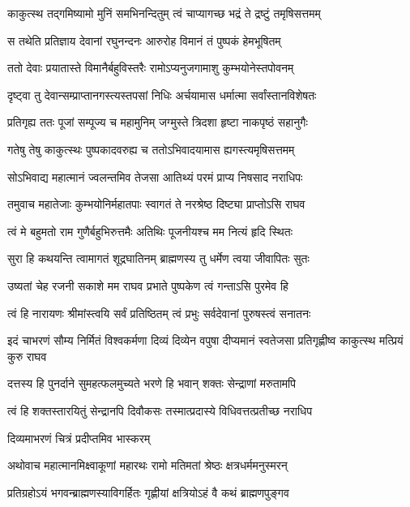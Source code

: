 \twolineshloka
{काकुत्स्थ तद्गमिष्यामो मुनिं समभिनन्दितुम्}
{त्वं चाप्यागच्छ भद्रं ते द्रष्टुं तमृषिसत्तमम्} %

\twolineshloka
{स तथेति प्रतिज्ञाय देवानां रघुनन्दनः}
{आरुरोह विमानं तं पुष्पकं हेमभूषितम्} %

\twolineshloka
{ततो देवाः प्रयातास्ते विमानैर्बहुविस्तरैः}
{रामोऽप्यनुजगामाशु कुम्भयोनेस्तपोवनम्} %

\twolineshloka
{दृष्ट्वा तु देवान्सम्प्राप्तानगस्त्यस्तपसां निधिः}
{अर्चयामास धर्मात्मा सर्वांस्तानविशेषतः} %

\twolineshloka
{प्रतिगृह्य ततः पूजां सम्पूज्य च महामुनिम्}
{जग्मुस्ते त्रिदशा हृष्टा नाकपृष्ठं सहानुगैः} %

\twolineshloka
{गतेषु तेषु काकुत्स्थः पुष्पकादवरुह्य च}
{ततोऽभिवादयामास ह्यगस्त्यमृषिसत्तमम्} %

\twolineshloka
{सोऽभिवाद्य महात्मानं ज्वलन्तमिव तेजसा}
{आतिथ्यं परमं प्राप्य निषसाद नराधिपः} %

\twolineshloka
{तमुवाच महातेजाः कुम्भयोनिर्महातपाः}
{स्वागतं ते नरश्रेष्ठ दिष्ट्या प्राप्तोऽसि राघव} %

\twolineshloka
{त्वं मे बहुमतो राम गुणैर्बहुभिरुत्तमैः}
{अतिथिः पूजनीयश्च मम नित्यं हृदि स्थितः} %

\twolineshloka
{सुरा हि कथयन्ति त्वामागतं शूद्रघातिनम्}
{ब्राह्मणस्य तु धर्मेण त्वया जीवापितः सुतः} %

\twolineshloka
{उष्यतां चेह रजनी सकाशे मम राघव}
{प्रभाते पुष्पकेण त्वं गन्ताऽसि पुरमेव हि} %

\twolineshloka
{त्वं हि नारायणः श्रीमांस्त्वयि सर्वं प्रतिष्ठितम्}
{त्वं प्रभुः सर्वदेवानां पुरुषस्त्वं सनातनः} %

\threelineshloka
{इदं चाभरणं सौम्य निर्मितं विश्वकर्मणा}
{दिव्यं दिव्येन वपुषा दीप्यमानं स्वतेजसा}
{प्रतिगृह्णीष्व काकुत्स्थ मत्प्रियं कुरु राघव} %

\twolineshloka
{दत्तस्य हि पुनर्दाने सुमहत्फलमुच्यते}
{भरणे हि भवान् शक्तः सेन्द्राणां मरुतामपि} %

\twolineshloka
{त्वं हि शक्तस्तारयितुं सेन्द्रानपि दिवौकसः}
{तस्मात्प्रदास्ये विधिवत्तत्प्रतीच्छ नराधिप} %

\onelineshloka
{दिव्यमाभरणं चित्रं प्रदीप्तमिव भास्करम्} %

\twolineshloka
{अथोवाच महात्मानमिक्ष्वाकूणां महारथः}
{रामो मतिमतां श्रेष्ठः क्षत्रधर्ममनुस्मरन्} %

\twolineshloka
{प्रतिग्रहोऽयं भगवन्ब्राह्मणस्याविगर्हितः}
{गृह्णीयां क्षत्रियोऽहं वै कथं ब्राह्मणपुङ्गव} %

